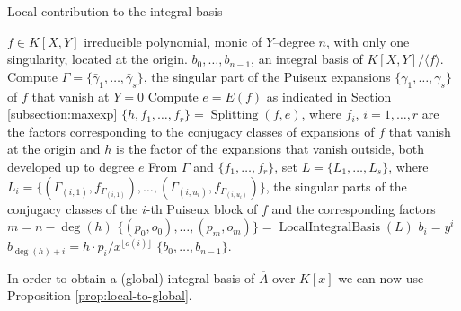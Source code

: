 \documentclass[a4paper,11pt]{amsart}%
\theoremstyle{definition}
\theoremstyle{plain}
\theoremstyle{remark}
\DeclareMathOperator{\LocalIntegralBasis}{LocalIntegralBasis}
\DeclareMathOperator{\Splitting}{Splitting}
\begin{document}


\begin{algorithm}                      %
\caption{Local contribution to the integral basis}          %
\label{alg:HenselBasis}
\begin{algorithmic}[1]
\REQUIRE $f \in K[X,Y]$ irreducible polynomial, monic of $Y$--degree $n$, with only one singularity, located at the origin.
\ENSURE $b_0, \dots, b_{n-1}$, an integral basis of $K[X, Y] / \langle f \rangle$.
\STATE Compute $\varGamma = \{\bar\gamma_1, \dots, \bar\gamma_s\}$, the singular part of the Puiseux expansions $\{\gamma_1, \dots, \gamma_s\}$ of $f$ that vanish at $Y = 0$
\STATE Compute $e = E(f)$ as indicated in Section \ref{subsection:maxexp}
\STATE $\{h, f_1, \dots, f_r\} = \Splitting(f, e)$, where $f_i$, $i = 1, \dots, r$ are the factors corresponding to the conjugacy classes of expansions of $f$ that vanish at the origin and $h$ is the factor of the expansions that vanish outside, both developed up to degree $e$
\STATE From $\varGamma$ and $\{f_1, \dots, f_r\}$, set $L = \{L_1, \dots, L_s\}$, where $L_i = \{(\varGamma_{(i,1)}, f_{\varGamma_{(i,1)}}),
\dots, (\varGamma_{(i, u_i)}, f_{\varGamma_{(i, u_i)}})\}$,
the singular parts of the conjugacy classes of the $i$-th Puiseux block of $f$ and the corresponding factors
\STATE $m = n - \deg(h)$
\STATE $\{(p_0, o_0), \dots, (p_m, o_m)\} = \LocalIntegralBasis(L)$
\STATE $b_i = y^i$
\ENDFOR
{}
\STATE $b_{\deg(h) + i} = h \cdot p_i / x^{\lfloor o(i) \rfloor}$
\ENDFOR
\RETURN $\{b_0, \dots, b_{n-1}\}$.
\end{algorithmic}
\end{algorithm}


In order to obtain a (global) integral basis of $\overline{A}$ over $K[x]$ we
can now use Proposition \ref{prop:local-to-global}.
\end{document}
